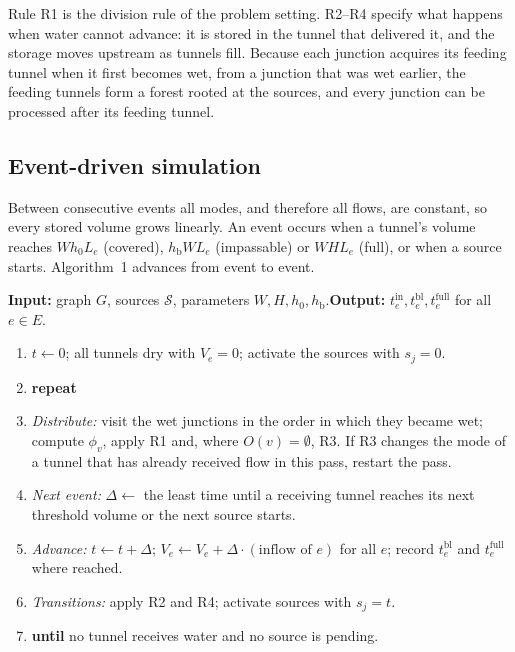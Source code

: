 \documentclass[11pt,a4paper]{article}
\theoremstyle{plain}
\theoremstyle{definition}
\theoremstyle{remark}
\newcommand{\tin}{t^{\mathrm{in}}}
\newcommand{\tbl}{t^{\mathrm{bl}}}
\newcommand{\tfull}{t^{\mathrm{full}}}
\newcommand{\hb}{h_{\mathrm{b}}}
\begin{document}
Rule R1 is the division rule of the problem setting. R2--R4 specify what happens when water cannot advance: it is stored in the tunnel that delivered it, and the storage moves upstream as tunnels fill. Because each junction acquires its feeding tunnel when it first becomes wet, from a junction that was wet earlier, the feeding tunnels form a forest rooted at the sources, and every junction can be processed after its feeding tunnel.

\subsection{Event-driven simulation}

Between consecutive events all modes, and therefore all flows, are constant, so every stored volume grows linearly. An event occurs when a tunnel's volume reaches $W h_0 L_e$ (covered), $\hb W L_e$ (impassable) or $W H L_e$ (full), or when a source starts. Algorithm~1 advances from event to event.

\begin{tcolorbox}[colback=white, colframe=black!60, boxrule=0.5pt, arc=0pt, left=6pt, right=6pt, top=4pt, bottom=4pt, fontupper=\small,
  title={\small\textbf{Algorithm 1.} Event-driven flood simulation}, coltitle=black, colbacktitle=black!8]
\textbf{Input:} graph $G$, sources $\mathcal{S}$, parameters $W, H, h_0, \hb$.\quad \textbf{Output:} $\tin_e, \tbl_e, \tfull_e$ for all $e \in E$.
\begin{enumerate}[label=\arabic*:, leftmargin=1.8em, itemsep=1pt, topsep=3pt]
  \item $t \gets 0$; all tunnels \textsf{dry} with $V_e = 0$; activate the sources with $s_j = 0$.
  \item \textbf{repeat}
  \item \quad\emph{Distribute:} visit the wet junctions in the order in which they became wet; compute $\phi_v$, apply R1 and, where $O(v) = \emptyset$, R3. If R3 changes the mode of a tunnel that has already received flow in this pass, restart the pass.
  \item \quad\emph{Next event:} $\Delta \gets$ the least time until a receiving tunnel reaches its next threshold volume or the next source starts.
  \item \quad\emph{Advance:} $t \gets t + \Delta$; $V_e \gets V_e + \Delta \cdot (\text{inflow of } e)$ for all $e$; record $\tbl_e$ and $\tfull_e$ where reached.
  \item \quad\emph{Transitions:} apply R2 and R4; activate sources with $s_j = t$.
  \item \textbf{until} no tunnel receives water and no source is pending.
\end{enumerate}
\end{tcolorbox}
\end{document}
